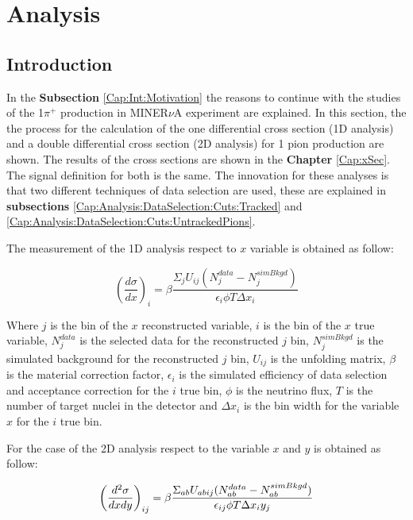 \chapter{Analysis}
\minitoc
\label{Cap:Analysis}

\section{Introduction}
\label{Cap:Analysis:Introduction}
In the \textbf{Subsection} \ref{Cap:Int:Motivation} the reasons to continue with the studies of the 1$\pi^+$ production in MINER$\nu$A experiment are explained. In this section, the the process for the calculation of the one differential cross section (1D analysis) and a double differential cross section (2D analysis) for 1 pion production are shown. The results of the cross sections are shown in the \textbf{Chapter} \ref{Cap:xSec}. The signal definition for both is the same. The innovation for these analyses is that two different techniques of data selection are used, these are explained in \textbf{subsections} \ref{Cap:Analysis:DataSelection:Cuts:Tracked} and \ref{Cap:Analysis:DataSelection:Cuts:UntrackedPions}. 

The measurement of the 1D analysis respect to $x$ variable is obtained as follow:

\begin{equation}
    \left(\frac{d\sigma}{dx}\right)_i= \beta \frac{\Sigma_{j}U_{ij}(N^{data}_j - N^{simBkgd}_j)}{\epsilon_{i}\phi T\Delta x_i}
    \label{eq:difXSec}
\end{equation}

Where $j$ is the bin of the $x$ reconstructed variable, $i$ is the bin of the $x$ true variable, $N_j^{data}$ is the selected data for the reconstructed $j$ bin, $N_j^{sim Bkgd}$ is the simulated background for the reconstructed $j$ bin, $U_{ij}$ is the unfolding matrix, $\beta$ is the material correction factor, $\epsilon_i$ is the simulated efficiency of data selection and acceptance correction for the $i$ true bin, $\phi$ is the neutrino flux, $T$ is the number of target nuclei in the detector and $\Delta x_i$ is the bin width for the variable $x$ for the $i$ true bin.

For the case of the 2D analysis respect to the variable $x$ and $y$ is obtained as follow:

\begin{equation}
    \centering
    \left(\frac{d^2\sigma}{dxdy}\right)_{ij}= \beta \frac{\Sigma_{ab}U_{abij}(N^{data}_{ab} - N^{simBkgd}_{ab})}{\epsilon_{ij}\phi T\Delta x_{i}y_j}
\end{equation}

